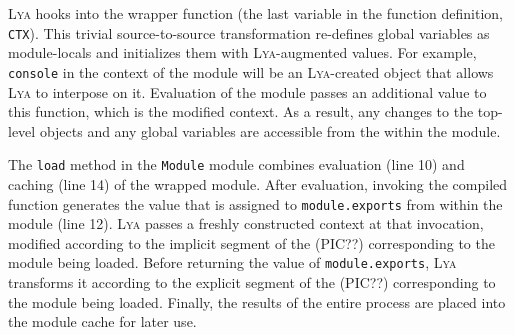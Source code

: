 \documentclass[letterpaper,twocolumn,10pt]{article}
\newcommand{\ttt}[1]{\texttt{#1}}
\newcommand{\sys}{{\scshape Lya}\xspace}
\begin{document}


\sys hooks into the wrapper function (the last variable in the function definition, \ttt{CTX}).
This trivial source-to-source transformation re-defines global variables as module-locals and initializes them with \sys-augmented values.
For example, \ttt{console} in the context of the module will be an \sys-created object that allows \sys to interpose on it.
Evaluation of the module passes an additional value to this function, which is the modified context.
As a result, any changes to the top-level objects and any global variables are accessible from the within the module.


The \ttt{load} method in the \ttt{Module} module combines evaluation (line 10) and caching (line 14) of the wrapped module.
After evaluation, invoking the compiled function generates the value that is assigned to \ttt{module.exports} from within the module (line 12).
\sys passes a freshly constructed context at that invocation, modified according to the implicit segment of the (PIC??) corresponding to the module being loaded.
Before returning the value of \ttt{module.exports}, \sys transforms it according to the explicit segment of the (PIC??) corresponding to the module being loaded.
Finally, the results of the entire process are placed into the module cache for later use.

\
\end{document}
